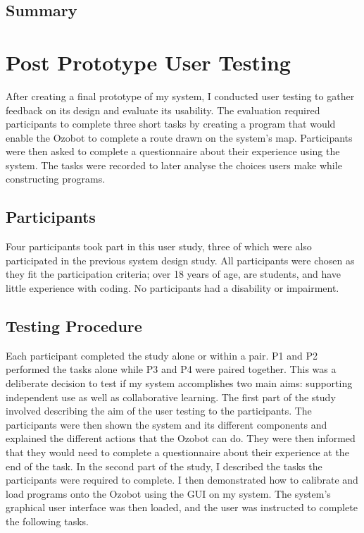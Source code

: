 \documentclass[oneside,%
                    author={Malak Hajji},
                    degree={BSc},
                    title={Designing An Accessible Computational Toolkit For Students},
                  subtitle={With Mixed Visual Abilities}]{dissertation}
\begin{document}
\section{Summary}









\chapter{Post Prototype User Testing}
\label{chap:testing}

After creating a final prototype of my system, I conducted user testing to gather feedback on its design and evaluate its usability. The evaluation required participants to complete three short tasks by creating a program that would enable the Ozobot to complete a route drawn on the system's map. Participants were then asked to complete a questionnaire about their experience using the system. The tasks were recorded to later analyse the choices users make while constructing programs.

\section{Participants}
Four participants took part in this user study, three of which were also participated in the previous system design study. All participants were chosen as they fit the participation criteria; over 18 years of age, are students, and have little experience with coding. No participants had a disability or impairment.

\section{Testing Procedure}

Each participant completed the study alone or within a pair. P1 and P2 performed the tasks alone while P3 and P4 were paired together. This was a deliberate decision to test if my system accomplishes two main aims: supporting independent use as well as collaborative learning. 
The first part of the study involved describing the aim of the user testing to the participants. The participants were then shown the system and its different components and explained the different actions that the Ozobot can do. They were then informed that they would need to complete a questionnaire about their experience at the end of the task. 
In the second part of the study, I described the tasks the participants were required to complete. I then demonstrated how to calibrate and load programs onto the Ozobot using the GUI on my system. The system's graphical user interface was then loaded, and the user was instructed to complete the following tasks.
\end{document}
